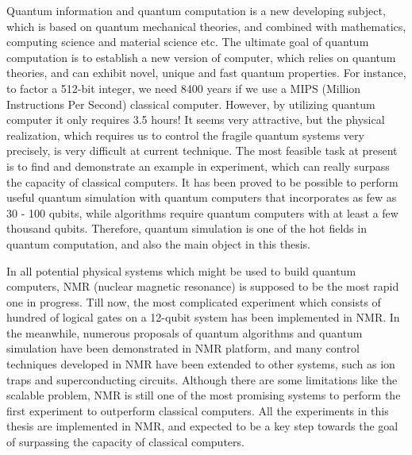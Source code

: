 \begin{englishabstract}
Quantum information and quantum computation is a new developing subject, which is based on quantum mechanical theories, and combined with mathematics, computing science and material science etc. The ultimate goal of quantum computation is to establish a new version of computer, which relies on quantum theories, and can exhibit novel, unique and fast quantum properties. For instance, to factor a 512-bit integer, we need 8400 years if we use a MIPS (Million Instructions Per Second) classical computer. However, by utilizing quantum computer it only requires 3.5 hours! It seems very attractive, but the physical realization, which requires us to control the fragile quantum systems very precisely, is very difficult at current technique. The most feasible task at present is to find and demonstrate an example in experiment, which can really surpass the capacity of classical  computers. It has been proved to be possible to perform useful quantum simulation with quantum computers that incorporates as few as 30 - 100 qubits, while algorithms require quantum computers with at least a few thousand qubits. Therefore, quantum simulation is one of  the hot fields in quantum computation, and also the main object in this thesis.

In all potential physical systems which might be used to build quantum computers, NMR (nuclear magnetic resonance) is supposed to be the most rapid one in progress. Till now, the most complicated experiment which consists of hundred of logical gates on a 12-qubit system has been implemented in NMR. In the meanwhile, numerous proposals of quantum algorithms and quantum simulation have been demonstrated in NMR platform, and many control techniques developed in NMR have been extended to other systems, such as ion traps and superconducting circuits. Although there are some limitations like the scalable problem, NMR is still one of the most promising systems to perform the first experiment to outperform classical computers. All the experiments in this thesis are implemented in NMR, and expected to be a key step towards the goal of surpassing the capacity of classical computers.


\end{englishabstract}
